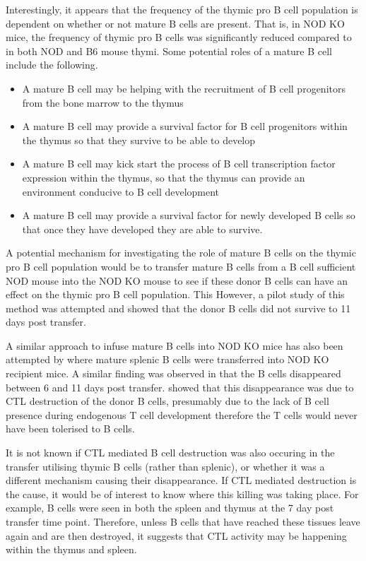 Interestingly, it appears that the frequency of the thymic pro B cell population is dependent on whether or not mature B cells are present.
That is, in NOD KO mice, the frequency of thymic pro B cells was significantly reduced compared to in both NOD and B6 mouse thymi.
Some potential roles of a mature B cell include the following.
\begin{itemize}
\item A mature B cell may be helping with the recruitment of B cell progenitors from the bone marrow to the thymus
\item A mature B cell may provide a survival factor for B cell progenitors within the thymus so that they survive to be able to develop
\item A mature B cell may kick start the process of B cell transcription factor expression within the thymus, so that the thymus can provide an environment conducive to B cell development
\item A mature B cell may provide a survival factor for newly developed B cells so that once they have developed they are able to survive.
\end{itemize}

A potential mechanism for investigating the role of mature B cells on the thymic pro B cell population would be to transfer mature B cells from a B cell sufficient NOD mouse into the NOD KO mouse to see if these donor B cells can have an effect on the thymic pro B cell population.
This 
However, a pilot study of this method was attempted and showed that the donor B cells did not survive to 11 days post transfer.

A similar approach to infuse mature B cells into NOD KO mice has also been attempted by \citet{Serreze1998} where mature splenic B cells were transferred into NOD KO recipient mice. 
A similar finding was observed in that the B cells disappeared between 6 and 11 days post transfer.
\citet{Serreze1998} showed that this disappearance was due to CTL destruction of the donor B cells, presumably due to the lack of B cell presence during endogenous T cell development therefore the T cells would never have been tolerised to B cells.

It is not known if CTL mediated B cell destruction was also occuring in the transfer utilising thymic B cells (rather than splenic), or whether it was a different mechanism causing their disappearance. 
If CTL mediated destruction is the cause, it would be of interest to know where this killing was taking place. 
For example, B cells were seen in both the spleen and thymus at the 7 day post transfer time point.
Therefore, unless B cells that have reached these tissues leave again and are then destroyed, it suggests that CTL activity may be happening within the thymus and spleen. 

